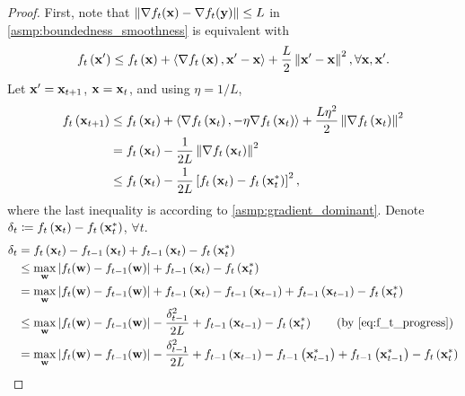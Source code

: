 \begin{proof}
First, note that $\left\| \nabla f_t({\mathbf{x}} ) - \nabla f_t({\mathbf{y}}) \right\| \le L $ in \cref{asmp:boundedness_smoothness} is equivalent with
\begin{equation*}
\begin{split}
    f_t\left({\mathbf{x}}^\prime\right) \le f_t\left({\mathbf{x}}\right) + \left\langle \nabla f_t\left({\mathbf{x}}\right) , {\mathbf{x}}^\prime - {\mathbf{x}} \right\rangle +  \frac{L}{2} \left\| {\mathbf{x}}^\prime - {\mathbf{x}} \right\|^2, \forall {\mathbf{x}}, {\mathbf{x}}^\prime.
\end{split}
\end{equation*}
Let ${\mathbf{x}}^\prime = {\mathbf{x}}_{t+1}$, ${\mathbf{x}} = {\mathbf{x}}_{t}$, and using $\eta = 1/L$,
\begin{equation}
\label{eq:f_t_progress}
\begin{split}
    f_t\left({\mathbf{x}}_{t+1}\right) &\le f_t\left({\mathbf{x}}_{t}\right) + \left\langle \nabla f_t\left({\mathbf{x}}_t\right) , - \eta \nabla f_t\left({\mathbf{x}}_t\right) \right\rangle +  \frac{L \eta^2}{2} \left\| \nabla f_t\left({\mathbf{x}}_t\right) \right\|^2 \\
    &= f_t\left({\mathbf{x}}_{t}\right) - \frac{1}{2 L} \left\| \nabla f_t\left({\mathbf{x}}_t\right) \right\|^2 \\
    &\le f_t\left({\mathbf{x}}_{t}\right) - \frac{1}{2 L} \left[ f_t\left({\mathbf{x}}_t\right) - f_t\left({\mathbf{x}}_t^*\right) \right]^2,
\end{split}
\end{equation}
where the last inequality is according to \cref{asmp:gradient_dominant}. Denote $\delta_t \coloneqq f_t\left({\mathbf{x}}_t\right) - f_t\left( {\mathbf{x}}_t^* \right)$, $\forall t$.
\begin{equation*}
\begin{split}
    \delta_t &= f_t\left(\rvx_t\right) - f_{t-1}\left(\rvx_t\right) + f_{t-1}\left(\rvx_t\right) - f_t\left( \rvx_t^* \right) \\
    &\le \max\limits_{\rvw}{\left| f_{t}(\rvw) - f_{t-1}(\rvw) \right| } + f_{t-1}\left(\rvx_t\right) - f_t\left( \rvx_t^* \right) \\
    &= \max\limits_{\rvw}{\left| f_{t}(\rvw) - f_{t-1}(\rvw) \right| } + f_{t-1}\left(\rvx_t\right) - f_{t-1}\left(\rvx_{t-1}\right) + f_{t-1}\left(\rvx_{t-1}\right) - f_t\left( \rvx_t^* \right) \\
    &\le \max\limits_{\rvw}{\left| f_{t}(\rvw) - f_{t-1}(\rvw) \right| } - \frac{\delta_{t-1}^2}{2L} + f_{t-1}\left(\rvx_{t-1}\right) - f_t\left( \rvx_t^* \right) \qquad \left( \text{by \cref{eq:f_t_progress}} \right) \\
    &=  \max\limits_{\rvw}{\left| f_{t}(\rvw) - f_{t-1}(\rvw) \right| } - \frac{\delta_{t-1}^2}{2L} + f_{t-1}\left(\rvx_{t-1}\right) - f_{t-1}\left(\rvx_{t-1}^*\right) + f_{t-1}\left(\rvx_{t-1}^*\right) - f_t\left( \rvx_t^* \right) \\

\end{split}
\end{equation*}
\end{proof}
